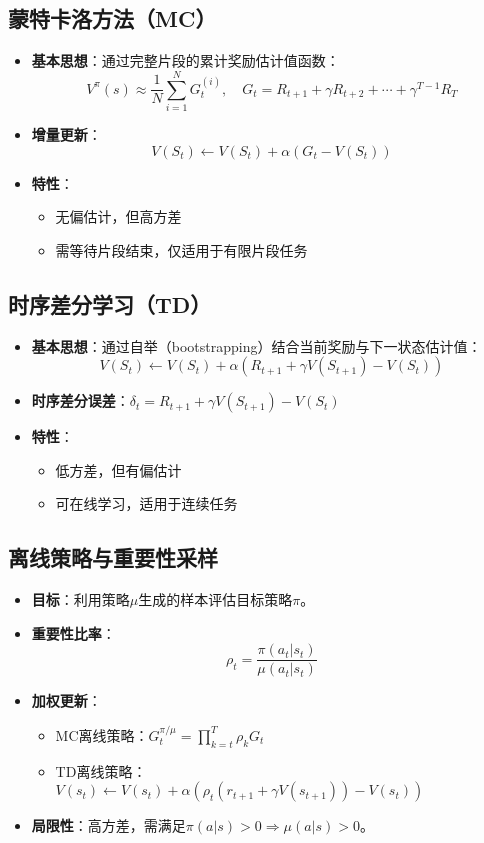 \subsection{蒙特卡洛方法（MC）}
\begin{itemize}
    \item \textbf{基本思想}：通过完整片段的累计奖励估计值函数：
        \[
        V^\pi(s) \approx \frac{1}{N} \sum_{i=1}^N G_t^{(i)}, \quad G_t = R_{t+1} + \gamma R_{t+2} + \cdots + \gamma^{T-1} R_T
        \]
    \item \textbf{增量更新}：
        \[
        V(S_t) \leftarrow V(S_t) + \alpha \left( G_t - V(S_t) \right)
        \]
    \item \textbf{特性}：
        \begin{itemize}
            \item 无偏估计，但高方差
            \item 需等待片段结束，仅适用于有限片段任务
        \end{itemize}
\end{itemize}

\subsection{时序差分学习（TD）}
\begin{itemize}
    \item \textbf{基本思想}：通过自举（bootstrapping）结合当前奖励与下一状态估计值：
        \[
        V(S_t) \leftarrow V(S_t) + \alpha \left( R_{t+1} + \gamma V(S_{t+1}) - V(S_t) \right)
        \]
    \item \textbf{时序差分误差}：$\delta_t = R_{t+1} + \gamma V(S_{t+1}) - V(S_t)$
    \item \textbf{特性}：
        \begin{itemize}
            \item 低方差，但有偏估计
            \item 可在线学习，适用于连续任务
        \end{itemize}
\end{itemize}

\subsection{离线策略与重要性采样}
\begin{itemize}
    \item \textbf{目标}：利用策略$\mu$生成的样本评估目标策略$\pi$。
    \item \textbf{重要性比率}：
        \[
        \rho_t = \frac{\pi(a_t|s_t)}{\mu(a_t|s_t)}
        \]
    \item \textbf{加权更新}：
        \begin{itemize}
            \item MC离线策略：$G_t^{\pi/\mu} = \prod_{k=t}^T \rho_k G_t$
            \item TD离线策略：$V(s_t) \leftarrow V(s_t) + \alpha \left( \rho_t (r_{t+1} + \gamma V(s_{t+1})) - V(s_t) \right)$
        \end{itemize}
    \item \textbf{局限性}：高方差，需满足$\pi(a|s) > 0 \Rightarrow \mu(a|s) > 0$。
\end{itemize}

